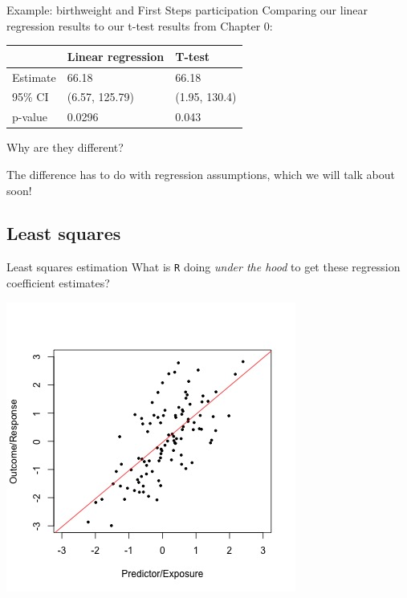 \documentclass[10pt,t]{beamer}
\begin{document}
\begin{frame}{Example: birthweight and First Steps participation}
Comparing our linear regression results to our t-test results from Chapter 0:

\vspace{0.3cm}

\begin{table}[]
	\begin{tabular}{l|ll}
		& Linear regression & T-test         \\ \hline
		Estimate & 66.18             & 66.18          \\ \hline
		95\% CI  & (6.57, 125.79)    & (1.95, 130.4) \\ \hline
		p-value  & 0.0296            & 0.043        
	\end{tabular}
\end{table} 
\medskip
Why are they different?\pause

\vspace{0.3cm}

The difference has to do with regression assumptions, which we will talk about soon!

\end{frame}

\subsection{Least squares}

\begin{frame}{Least squares estimation}
What is \texttt{R} doing \textit{under the hood} to get these regression coefficient estimates? \pause

\vspace{0.3cm}

\centering \includegraphics[scale=0.45]{figures/linear-regr.jpg}
\end{frame}
\end{document}
